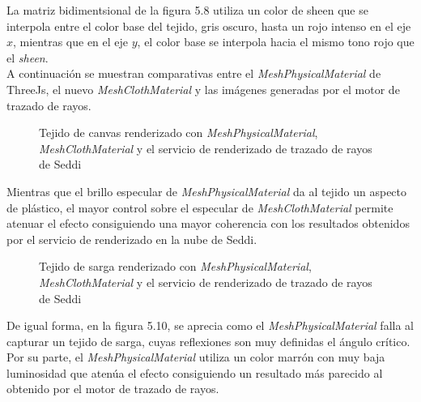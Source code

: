 La matriz bidimentsional de la figura 5.8 utiliza un color de sheen que se interpola entre el color base del tejido,
gris oscuro, hasta un rojo intenso en el eje $x$, mientras que en el eje $y$, el color base se interpola hacia el mismo
tono rojo que el \textit{sheen}.\\

\singlespacing
A continuaci\'on se muestran comparativas entre el \textit{MeshPhysicalMaterial} de ThreeJs, el nuevo \textit{MeshClothMaterial}
y las im\'agenes generadas por el motor de trazado de rayos.

\begin{figure}[H]
  \vspace{0.5cm}
  \centering
    \caption{Tejido de canvas renderizado con \textit{MeshPhysicalMaterial}, \textit{MeshClothMaterial} y el servicio de renderizado de trazado de rayos de Seddi}
\end{figure}

Mientras que el brillo especular de \textit{MeshPhysicalMaterial} da al tejido un aspecto de pl\'astico, el mayor control sobre
el especular de \textit{MeshClothMaterial} permite atenuar el efecto consiguiendo una mayor coherencia con los resultados obtenidos
por el servicio de renderizado en la nube de Seddi.

\begin{figure}[H]
  \vspace{0.5cm}
  \centering
    \caption{Tejido de sarga renderizado con \textit{MeshPhysicalMaterial}, \textit{MeshClothMaterial} y el servicio de renderizado de trazado de rayos de Seddi}
\end{figure}

De igual forma, en la figura 5.10, se aprecia como el \textit{MeshPhysicalMaterial} falla al capturar un tejido de sarga, cuyas reflexiones
son muy definidas el \'angulo cr\'itico. Por su parte, el \textit{MeshPhysicalMaterial} utiliza un color marr\'on con
muy baja luminosidad que aten\'ua el efecto consiguiendo un resultado m\'as parecido al obtenido por el motor de trazado de rayos.
